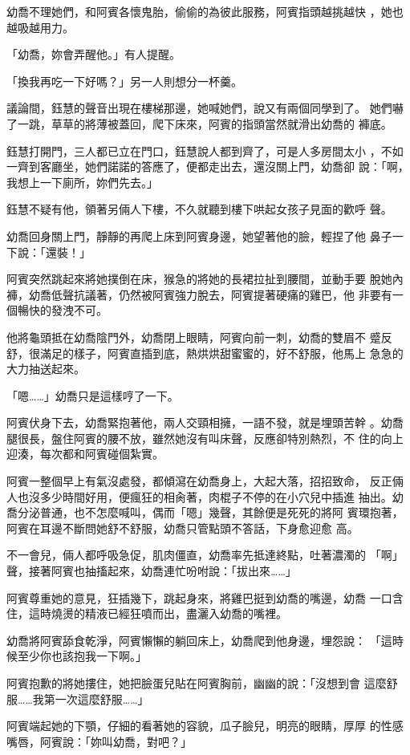 幼喬不理她們，和阿賓各懷鬼胎，偷偷的為彼此服務，阿賓指頭越挑越快
，她也越吸越用力。

「幼喬，妳會弄醒他。」有人提醒。

「換我再吃一下好嗎？」另一人則想分一杯羹。

議論間，鈺慧的聲音出現在樓梯那邊，她喊她們，說又有兩個同學到了。
她們嚇了一跳，草草的將薄被蓋回，爬下床來，阿賓的指頭當然就滑出幼喬的
褲底。

鈺慧打開門，三人都已立在門口，鈺慧說人都到齊了，可是人多房間太小
，不如一齊到客廳坐，她們諾諾的答應了，便都走出去，還沒關上門，幼喬卻
說：「啊，我想上一下廁所，妳們先去。」

鈺慧不疑有他，領著另倆人下樓，不久就聽到樓下哄起女孩子見面的歡呼
聲。

幼喬回身關上門，靜靜的再爬上床到阿賓身邊，她望著他的臉，輕捏了他
鼻子一下說：「還裝！」

阿賓突然跳起來將她撲倒在床，猴急的將她的長裙拉扯到腰間，並動手要
脫她內褲，幼喬低聲抗議著，仍然被阿賓強力脫去，阿賓提著硬痛的雞巴，他
非要有一個暢快的發洩不可。

他將龜頭抵在幼喬陰門外，幼喬閉上眼睛，阿賓向前一刺，幼喬的雙眉不
蹙反舒，很滿足的樣子，阿賓直插到底，熱烘烘甜蜜蜜的，好不舒服，他馬上
急急的大力抽送起來。

「嗯……」幼喬只是這樣哼了一下。

阿賓伏身下去，幼喬緊抱著他，兩人交頸相擁，一語不發，就是埋頭苦幹
。幼喬腿很長，盤住阿賓的腰不放，雖然她沒有叫床聲，反應卻特別熱烈，不
住的向上迎湊，每次都和阿賓碰個紮實。

阿賓一整個早上有氣沒處發，都傾瀉在幼喬身上，大起大落，招招致命，
反正倆人也沒多少時間好用，便瘋狂的相肏著，肉棍子不停的在小穴兒中插進
抽出。幼喬分泌普通，也不怎麼喊叫，偶而「嗯」幾聲，其餘便是死死的將阿
賓環抱著，阿賓在耳邊不斷問她舒不舒服，幼喬只管點頭不答話，下身愈迎愈
高。

不一會兒，倆人都呼吸急促，肌肉僵直，幼喬率先抵達終點，吐著濃濁的
「啊」聲，接著阿賓也抽搐起來，幼喬連忙吩咐說：「拔出來……」

阿賓尊重她的意見，狂插幾下，跳起身來，將雞巴挺到幼喬的嘴邊，幼喬
一口含住，這時燒燙的精液已經狂噴而出，盡灑入幼喬的嘴裡。

幼喬將阿賓舔食乾淨，阿賓懶懶的躺回床上，幼喬爬到他身邊，埋怨說：
「這時候至少你也該抱我一下啊。」

阿賓抱歉的將她摟住，她把臉蛋兒貼在阿賓胸前，幽幽的說：「沒想到會
這麼舒服……我第一次這麼舒服……」

阿賓端起她的下顎，仔細的看著她的容貌，瓜子臉兒，明亮的眼睛，厚厚
的性感嘴唇，阿賓說：「妳叫幼喬，對吧？」


